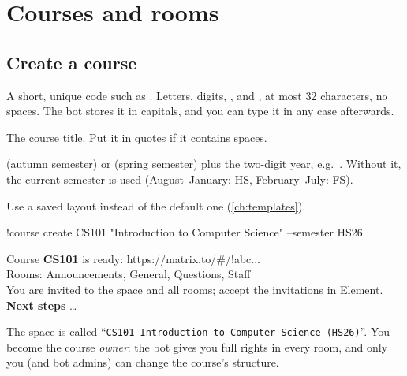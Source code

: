 \chapter{Courses and rooms}
\label{ch:courses}

\section{Create a course}

\begin{center}
\end{center}

\begin{description}[leftmargin=7em,style=sameline,font=\normalfont\ttfamily]
  \item[<code>] A short, unique code such as . Letters, digits, , \cmd{_} and
        \cmd{-}, at most 32 characters, no spaces. The bot stores it in capitals, and you can
        type it in any case afterwards.
  \item["<title>"] The course title. Put it in quotes if it contains spaces.
  \item[--semester]  (autumn semester) or  (spring semester) plus the
        two-digit year, e.g.\ . Without it, the current semester is used
        (August--January: HS, February--July: FS).
  \item[--template] Use a saved layout instead of the default one (\autoref{ch:templates}).
\end{description}

\begin{you}
!course create CS101 "Introduction to Computer Science" --semester HS26
\end{you}
\begin{botreply}
Course \textbf{CS101} is ready: https://matrix.to/\#/!abc...\\
Rooms: Announcements, General, Questions, Staff\\
You are invited to the space and all rooms; accept the invitations in Element.\\[4pt]
\textbf{Next steps} \dots
\end{botreply}

The space is called \enquote{\texttt{CS101 Introduction to Computer Science (HS26)}}. You
become the course \emph{owner}: the bot gives you full rights in every room, and only you
(and bot admins) can change the course's structure.

